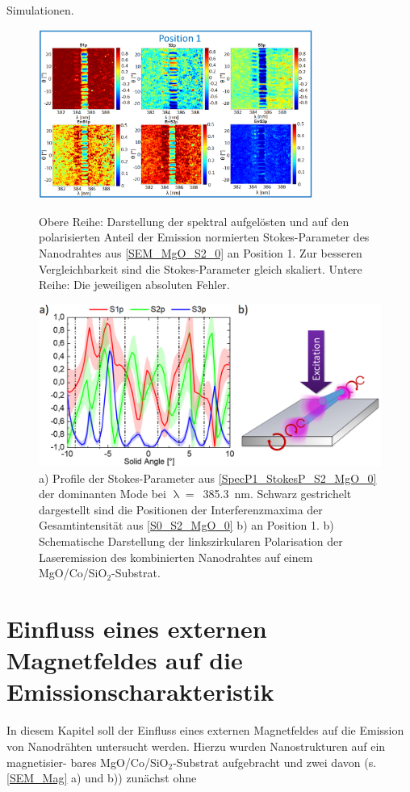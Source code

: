 Simulationen. \begin{figure}[h] \centering
\includegraphics[width=0.8\textwidth]{Bilder/MgO/SpecP1_StokesP_S2_MgO_0}
\caption{Obere Reihe: Darstellung der spektral aufgelösten und auf den
polarisierten Anteil der Emission normierten Stokes-Parameter des Nanodrahtes
aus \autoref{SEM_MgO_S2_0} an Position 1. Zur besseren Vergleichbarkeit sind die
Stokes-Parameter gleich skaliert. Untere Reihe: Die jeweiligen absoluten
Fehler.} \label{SpecP1_StokesP_S2_MgO_0}
\includegraphics[width=.6\textwidth]{Bilder/MgO/SpecP1_StokesP_Line_S2_MgO_0}
\caption{a) Profile der Stokes-Parameter aus \autoref{SpecP1_StokesP_S2_MgO_0}
der dominanten Mode bei \mbox{$\uplambda=$ 385.3 nm}. Schwarz gestrichelt
dargestellt sind die Positionen der Interferenzmaxima der Gesamtintensität aus
\autoref{S0_S2_MgO_0} b) an Position 1. b) Schematische Darstellung der
linkszirkularen Polarisation der Laseremission des kombinierten Nanodrahtes auf
einem MgO/Co/SiO$_\text{2}$-Substrat.} \label{SpecP1_StokesP_Line_S2_MgO_0}
\end{figure} \chapter{Einfluss eines externen Magnetfeldes auf die
Emissionscharakteristik} In diesem Kapitel soll der Einfluss eines externen
Magnetfeldes auf die Emission von Nanodrähten untersucht werden. Hierzu wurden
Nanostrukturen auf ein magnetisier- bares MgO/Co/SiO$_\text{2}$-Substrat
aufgebracht und zwei davon (s. \autoref{SEM_Mag} a) und b)) zunächst ohne
